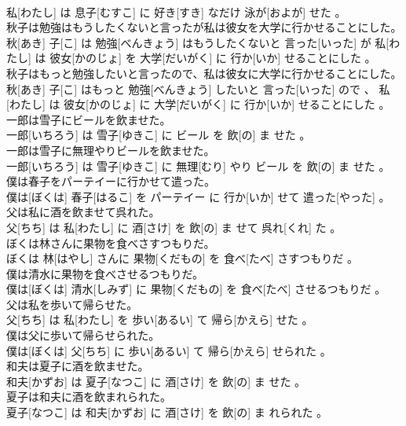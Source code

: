 \documentclass[8pt]{extreport}
\begin{document}
\begin{CJK}{UTF8}{min}
\\	私[わたし] は 息子[むすこ] に 好き[すき] なだけ 泳が[およが] せた 。
\\	秋子は勉強はもうしたくないと言ったが私は彼女を大学に行かせることにした。	
\\	秋[あき] 子[こ] は 勉強[べんきょう] はもうしたくないと 言った[いった] が 私[わたし] は 彼女[かのじょ] を 大学[だいがく] に 行か[いか] せることにした 。
\\	秋子はもっと勉強したいと言ったので、私は彼女に大学に行かせることにした。	
\\	秋[あき] 子[こ] はもっと 勉強[べんきょう] したいと 言った[いった] ので 、 私[わたし] は 彼女[かのじょ] に 大学[だいがく] に 行か[いか] せることにした 。
\\	一郎は雪子にビールを飲ませた。	
\\	一郎[いちろう] は 雪子[ゆきこ] に ビール を 飲[の] ま せた 。
\\	一郎は雪子に無理やりビールを飲ませた。	
\\	一郎[いちろう] は 雪子[ゆきこ] に 無理[むり] やり ビール を 飲[の] ま せた 。
\\	僕は春子をパーテイーに行かせて遣った。	
\\	僕は[ぼくは] 春子[はるこ] を パーテイー に 行か[いか] せて 遣った[やった] 。
\\	父は私に酒を飲ませて呉れた。	
\\	父[ちち] は 私[わたし] に 酒[さけ] を 飲[の] ま せて 呉れ[くれ] た 。
\\	ぼくは林さんに果物を食べさすつもりだ。	
\\	ぼくは 林[はやし] さんに 果物[くだもの] を 食べ[たべ] さすつもりだ 。
\\	僕は清水に果物を食べさせるつもりだ。	
\\	僕は[ぼくは] 清水[しみず] に 果物[くだもの] を 食べ[たべ] させるつもりだ 。
\\	父は私を歩いて帰らせた。	
\\	父[ちち] は 私[わたし] を 歩い[あるい] て 帰ら[かえら] せた 。
\\	僕は父に歩いて帰らせられた。	
\\	僕は[ぼくは] 父[ちち] に 歩い[あるい] て 帰ら[かえら] せられた 。
\\	和夫は夏子に酒を飲ませた。	
\\	和夫[かずお] は 夏子[なつこ] に 酒[さけ] を 飲[の] ま せた 。
\\	夏子は和夫に酒を飲まれられた。	
\\	夏子[なつこ] は 和夫[かずお] に 酒[さけ] を 飲[の] ま れられた 。

\end{CJK}
\end{document}
